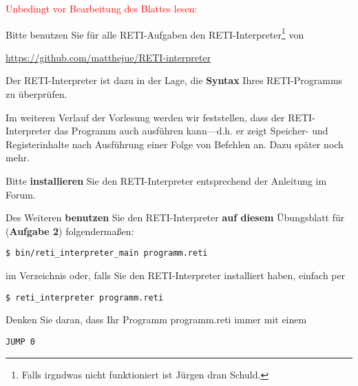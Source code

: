 \documentclass{article}
\newenvironment{adjustedminipage}[1]
  {\vspace{0.15cm}\begin{minipage}{#1}}
  {\end{minipage}}
\begin{document}
\textcolor{red}{Unbedingt vor Bearbeitung des Blattes lesen:}

Bitte benutzen Sie für alle RETI-Aufgaben den RETI-Interpreter\footnote{Falls irgndwas nicht funktioniert ist Jürgen dran Schuld.} von

\begin{center}
	\begin{adjustedminipage}{0.9\textwidth}
    \url{https://github.com/matthejue/RETI-interpreter}
	\end{adjustedminipage}
\end{center}

Der RETI-Interpreter ist dazu in der Lage, die \textbf{Syntax} Ihres RETI-Programms zu überprüfen.

Im weiteren Verlauf der Vorlesung werden wir feststellen, dass der RETI-Interpreter das Programm auch ausführen kann—d.h. er zeigt Speicher- und Registerinhalte nach Ausführung einer Folge von Befehlen an. Dazu später noch mehr.

Bitte \textbf{installieren} Sie den RETI-Interpreter entsprechend der Anleitung im Forum.

Des Weiteren \textbf{benutzen} Sie den RETI-Interpreter \textbf{auf diesem} Übungsblatt für (\textbf{Aufgabe 2}) folgendermaßen:

\begin{center}
	\begin{adjustedminipage}{0.9\textwidth}
		\begin{verbatim}
$ bin/reti_interpreter_main programm.reti
    \end{verbatim}
	\end{adjustedminipage}
\end{center}

	im Verzeichnis oder, falls Sie den RETI-Interpreter installiert haben, einfach per

\begin{center}
	\begin{adjustedminipage}{0.9\textwidth}
		\begin{verbatim}
$ reti_interpreter programm.reti
    \end{verbatim}
	\end{adjustedminipage}
\end{center}

Denken Sie daran, dass Ihr Programm programm.reti immer mit einem

\begin{center}
	\begin{adjustedminipage}{0.9\textwidth}
		\begin{verbatim}
JUMP 0
    \end{verbatim}
	\end{adjustedminipage}
\end{center}
\end{document}
